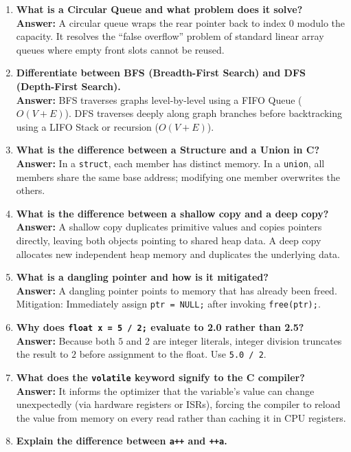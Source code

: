 \begin{enumerate}[leftmargin=*,label=\textbf{Q\arabic*.}]
    \item \textbf{What is a Circular Queue and what problem does it solve?} \\
    \textbf{Answer:} A circular queue wraps the rear pointer back to index $0$ modulo the capacity. It resolves the ``false overflow'' problem of standard linear array queues where empty front slots cannot be reused.
    \item \textbf{Differentiate between BFS (Breadth-First Search) and DFS (Depth-First Search).} \\
    \textbf{Answer:} BFS traverses graphs level-by-level using a FIFO Queue ($O(V+E)$). DFS traverses deeply along graph branches before backtracking using a LIFO Stack or recursion ($O(V+E)$).
    \item \textbf{What is the difference between a Structure and a Union in C?} \\
    \textbf{Answer:} In a \texttt{struct}, each member has distinct memory. In a \texttt{union}, all members share the same base address; modifying one member overwrites the others.
    \item \textbf{What is the difference between a shallow copy and a deep copy?} \\
    \textbf{Answer:} A shallow copy duplicates primitive values and copies pointers directly, leaving both objects pointing to shared heap data. A deep copy allocates new independent heap memory and duplicates the underlying data.
    \item \textbf{What is a dangling pointer and how is it mitigated?} \\
    \textbf{Answer:} A dangling pointer points to memory that has already been freed. Mitigation: Immediately assign \texttt{ptr = NULL;} after invoking \texttt{free(ptr);}.
    \item \textbf{Why does \texttt{float x = 5 / 2;} evaluate to 2.0 rather than 2.5?} \\
    \textbf{Answer:} Because both $5$ and $2$ are integer literals, integer division truncates the result to $2$ before assignment to the float. Use \texttt{5.0 / 2}.
    \item \textbf{What does the \texttt{volatile} keyword signify to the C compiler?} \\
    \textbf{Answer:} It informs the optimizer that the variable's value can change unexpectedly (via hardware registers or ISRs), forcing the compiler to reload the value from memory on every read rather than caching it in CPU registers.
    \item \textbf{Explain the difference between \texttt{a++} and \texttt{++a}.} \\

\end{enumerate}
